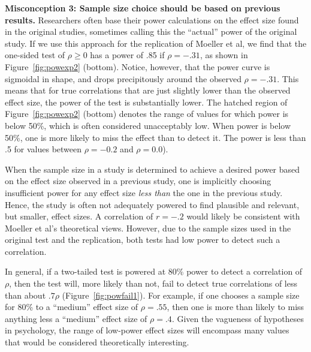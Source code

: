 \documentclass[doc,a4paper,floatsintext,draftfirst]{apa6}
\begin{document}
{\bf Misconception 3: Sample size choice should be based on previous results.} Researchers often base their power calculations on the effect size found in the original studies, sometimes calling this the ``actual'' power of the original study. If we use this approach for the replication of Moeller et al, we find that the one-sided test of $\rho\geq0$ has a power of .85 if $\rho=-.31$, as shown in Figure~\ref{fig:powexp2} (bottom). Notice, however, that the power curve is sigmoidal in shape, and drops precipitously around the observed $\rho=-.31$. This means that for true correlations that are just slightly lower than the observed effect size, the power of the test is substantially lower. The hatched region of Figure~\ref{fig:powexp2} (bottom) denotes the range of values for which power is below 50\%, which is often considered unacceptably low. When power is below 50\%, one is more likely to miss the effect than to detect it. The power is less than .5 for values between $\rho=-0.2$ and $\rho=0.0$). 

When the sample size in a study is determined to achieve a desired power based on the effect size observed in a previous study, one is implicitly choosing insufficient power for any effect size {\em less than} the one in the previous study. Hence, the study is often not adequately powered to find plausible and relevant, but smaller, effect sizes. A correlation of $r=-.2$ would likely be consistent with Moeller et al's theoretical views. However, due to the sample sizes used in the original test and the replication, both tests had low power to detect such a correlation. 

In general, if a two-tailed test is powered at 80\% power to detect a correlation of $\rho$, then the test will, more likely than not, fail to detect true correlations of less than about $.7\rho$ (Figure~\ref{fig:powfail1}). For example, if one chooses a sample size for 80\% to a ``medium'' effect size of $\rho=.55$, then one is more than likely to miss anything less a ``medium'' effect size of $\rho=.4$. Given the vagueness of hypotheses in psychology, the range of low-power effect sizes will encompass many values that would be considered theoretically interesting. 
\end{document}

